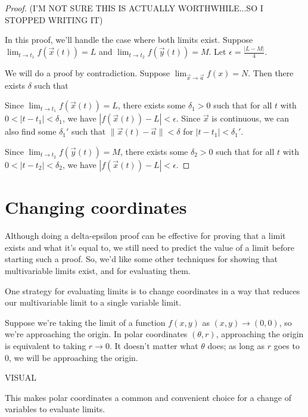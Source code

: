 \documentclass{ximera}
\begin{document}
\begin{proof}
(I'M NOT SURE THIS IS ACTUALLY WORTHWHILE...SO I STOPPED WRITING IT)

In this proof, we'll handle the case where both limits exist. Suppose $\lim_{t\rightarrow t_1}f(\vec{x}(t)) = L$ and $\lim_{t\rightarrow t_2}f(\vec{y}(t)) = M$. Let $\epsilon = \frac{|L-M|}{4}$.

We will do a proof by contradiction. Suppose $\lim_{\vec{x}\rightarrow\vec{a}}f(x)=N$. Then there exists $\delta$ such that 

Since $\lim_{t\rightarrow t_1}f(\vec{x}(t)) = L$, there exists some $\delta_1>0$ such that for all $t$ with $0<|t-t_1|<\delta_1$, we have $|f(\vec{x}(t))-L|<\epsilon$. Since $\vec{x}$ is continuous, we can also find some $\delta_1'$ such that $\|\vec{x}(t)-\vec{a}\|<\delta$ for $|t-t_1|<\delta_1'$. 

Since $\lim_{t\rightarrow t_2}f(\vec{y}(t)) = M$, there exists some $\delta_2>0$ such that for all $t$ with $0<|t-t_2|<\delta_2$, we have $|f(\vec{x}(t))-L|<\epsilon$.

\end{proof}

\section*{Changing coordinates}

Although doing a delta-epsilon proof can be effective for proving that a limit exists and what it's equal to, we still need to predict the value of a limit before starting such a proof. So, we'd like some other techniques for showing that multivariable limits exist, and for evaluating them.

One strategy for evaluating limits is to change coordinates in a way that reduces our multivariable limit to a single variable limit.

Suppose we're taking the limit of a function $f(x,y)$ as $(x,y)\rightarrow (0,0)$, so we're approaching the origin. In polar coordinates $(\theta, r)$, approaching the origin is equivalent to taking $r\rightarrow 0$. It doesn't matter what $\theta$ does; as long as $r$ goes to $0$, we will be approaching the origin.

VISUAL

This makes polar coordinates a common and convenient choice for a change of variables to evaluate limits.
\end{document}
